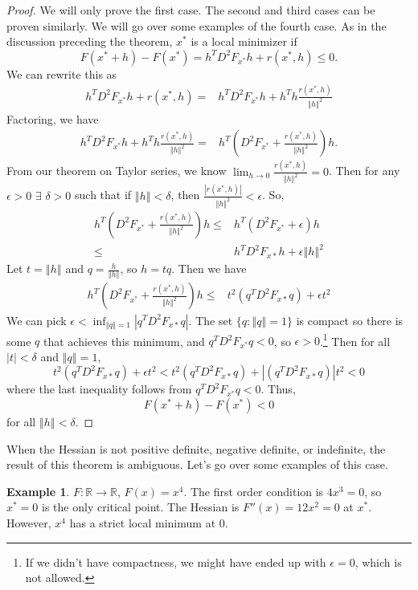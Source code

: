 \documentclass[12pt,reqno]{amsart}
\theoremstyle{definition}
\newtheorem{example}{Example}[section]
\def\R{\mathbb{R}}
\newcommand{\norm}[1]{\left\Vert {#1} \right\Vert}
\renewcommand{\to}{{\rightarrow}}
\begin{document}
\begin{proof}
  We will only prove the first case. The second and third cases can be
  proven similarly. We will go over some examples of the fourth
  case. As in the discussion preceding the theorem, $x^*$ is a local
  minimizer if
  \[ F(x^*+h) - F(x^*) = h^T D^2 F_{x^*} h + r(x^*,h) \leq 0. \]
  We can rewrite this as
  \begin{align*}
    h^T D^2 F_{x^*} h + r(x^*,h) = & h^T D^2 F_{x^*} h + h^T h
    \frac{r(x^*,h)}{\norm{h}^2} 
  \end{align*}
  Factoring, we have
  \begin{align*}
    h^T D^2 F_{x^*} h + h^T h \frac{r(x^*,h)}{\norm{h}^2} = 
    & 
    h^T \left( D^2 F_{x^*}+ \frac{r(x^*,h)}{\norm{h}^2} \right) h.
  \end{align*}
  From our theorem on Taylor series, we know $\lim_{h \to 0}
  \frac{r(x^*,h)}{\norm{h}^2} = 0$. Then for any $\epsilon > 0$
  $\exists$ $\delta > 0$ such that if $\norm{h} < \delta$, then
  $\frac{|r(x^*,h)|}{\norm{h}^2} < \epsilon$. So,
  \begin{align*}
    h^T \left( D^2 F_{x^*}+ \frac{r(x^*,h)}{\norm{h}^2} \right) h
    \leq & h^T \left( D^2 F_{x^*}+ \epsilon \right) h \\
    \leq & h^T D^2 F_{x*} h + \epsilon \norm{h}^2
  \end{align*}
  Let $t = \norm{h}$ and $q = \frac{h}{\norm{h}}$, so $h = t q$. 
  Then we have
   \begin{align*}
    h^T \left( D^2 F_{x^*}+ \frac{r(x^*,h)}{\norm{h}^2} \right) h
    \leq & t^2 (q^T D^2 F_{x*} q) + \epsilon t^2
  \end{align*}
  We can pick $\epsilon < \inf_{\norm{q} =1} |q^T D^2
  F_{x*} q|$. The set $\{q: \norm{q} = 1\}$ is compact so there is
  some $q$ that achieves this minimum, and $q^T D^2 F_{x^*} q < 0$, so
  $\epsilon >0$.\footnote{If we didn't have compactness, we might have ended
    up with $\epsilon =0$, which is not allowed.} 
  Then for all $|t|<\delta$ and $\norm{q} = 1$, 
  \[ t^2 (q^T D^2 F_{x*} q) + \epsilon t^2 < t^2
  (q^T D^2 F_{x*} q) + |(q^T D^2 F_{x*} q)|t^2 < 0 \]
  where the last inequality follows from $q^T D^2 F_{x^*} q< 0$.
  Thus, 
  \[  F(x^*+h) - F(x^*) < 0 \]
  for all $\norm{h} < \delta$.
\end{proof}

When the Hessian is not positive definite, negative definite, or
indefinite, the result of this theorem is ambiguous. Let's go over
some examples of this case.
\begin{example}
  $F:\R \to \R$, $F(x) = x^4$. The first order condition is $4x^3 =
  0$, so $x^* = 0$ is the only critical point. The Hessian is $F''(x)
  = 12x^2 = 0$ at $x^*$. However, $x^4$ has a strict local minimum at
  $0$.
\end{example}
\end{document}
